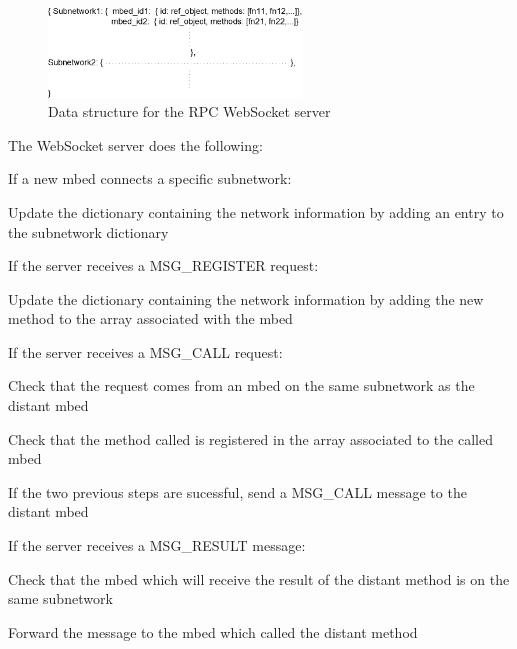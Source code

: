 \documentclass[pdftex,10pt,a4paper]{report}
\newenvironment{packed_item}{
\begin{itemize}
  \setlength{\itemsep}{1pt}
  \setlength{\parskip}{0pt}
  \setlength{\parsep}{0pt}
}{\end{itemize}}
\begin{document}
\begin{figure}[h!]
		\centering
		\includegraphics[width=0.6\textwidth]{./rpc_server_data_struct.jpg}
		\caption{Data structure for the RPC WebSocket server}
		\label{Data structure for the RPC WebSocket server}
\end{figure}


The WebSocket server does the following:
\begin{packed_item}
	\item If a new mbed connects a specific subnetwork:
	\begin{packed_item}
		\item Update the dictionary containing the network information by adding an entry to the subnetwork dictionary
	\end{packed_item}
	
	\item If the server receives a MSG\_REGISTER request:
	\begin{packed_item}
		\item Update the dictionary containing the network information by adding the new method to the array associated with the mbed
	\end{packed_item}
	
	\item If the server receives a MSG\_CALL request:
	\begin{packed_item}
		\item Check that the request comes from an mbed on the same subnetwork as the distant mbed
		\item Check that the method called is registered in the array associated to the called mbed
		\item If the two previous steps are sucessful, send a MSG\_CALL message to the distant mbed
	\end{packed_item}
	
	\item If the server receives a MSG\_RESULT message:
	\begin{packed_item}
		\item Check that the mbed which will receive the result of the distant method is on the same subnetwork
		\item Forward the message to the mbed which called the distant method
	\end{packed_item}
	
\end{packed_item}
	
\end{document}
